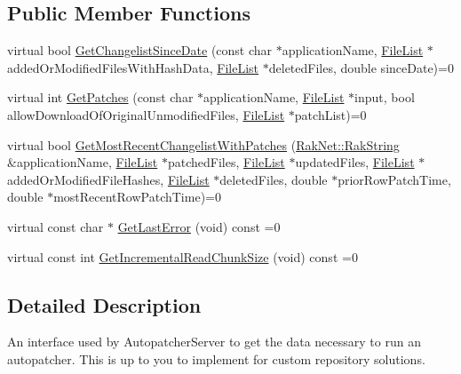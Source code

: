 \subsection*{Public Member Functions}
\begin{DoxyCompactItemize}
\item 
virtual bool \hyperlink{class_rak_net_1_1_autopatcher_repository_interface_a54058b725b12eb1186a94ba4e77ae87a}{Get\-Changelist\-Since\-Date} (const char $\ast$application\-Name, \hyperlink{class_rak_net_1_1_file_list}{File\-List} $\ast$added\-Or\-Modified\-Files\-With\-Hash\-Data, \hyperlink{class_rak_net_1_1_file_list}{File\-List} $\ast$deleted\-Files, double since\-Date)=0
\item 
virtual int \hyperlink{class_rak_net_1_1_autopatcher_repository_interface_aa1e6f1fff8fa2ade2a82c437a5da6947}{Get\-Patches} (const char $\ast$application\-Name, \hyperlink{class_rak_net_1_1_file_list}{File\-List} $\ast$input, bool allow\-Download\-Of\-Original\-Unmodified\-Files, \hyperlink{class_rak_net_1_1_file_list}{File\-List} $\ast$patch\-List)=0
\item 
virtual bool \hyperlink{class_rak_net_1_1_autopatcher_repository_interface_a1244493706ecbd21fbbc8ce5e198ee59}{Get\-Most\-Recent\-Changelist\-With\-Patches} (\hyperlink{class_rak_net_1_1_rak_string}{Rak\-Net\-::\-Rak\-String} \&application\-Name, \hyperlink{class_rak_net_1_1_file_list}{File\-List} $\ast$patched\-Files, \hyperlink{class_rak_net_1_1_file_list}{File\-List} $\ast$updated\-Files, \hyperlink{class_rak_net_1_1_file_list}{File\-List} $\ast$added\-Or\-Modified\-File\-Hashes, \hyperlink{class_rak_net_1_1_file_list}{File\-List} $\ast$deleted\-Files, double $\ast$prior\-Row\-Patch\-Time, double $\ast$most\-Recent\-Row\-Patch\-Time)=0
\item 
virtual const char $\ast$ \hyperlink{class_rak_net_1_1_autopatcher_repository_interface_a4975ce3c8337d41e4e0ac2d2f01f1c83}{Get\-Last\-Error} (void) const =0
\item 
virtual const int \hyperlink{class_rak_net_1_1_autopatcher_repository_interface_a37256a1ad98612546e6510140ca00d94}{Get\-Incremental\-Read\-Chunk\-Size} (void) const =0
\end{DoxyCompactItemize}


\subsection{Detailed Description}
An interface used by Autopatcher\-Server to get the data necessary to run an autopatcher. This is up to you to implement for custom repository solutions. 

